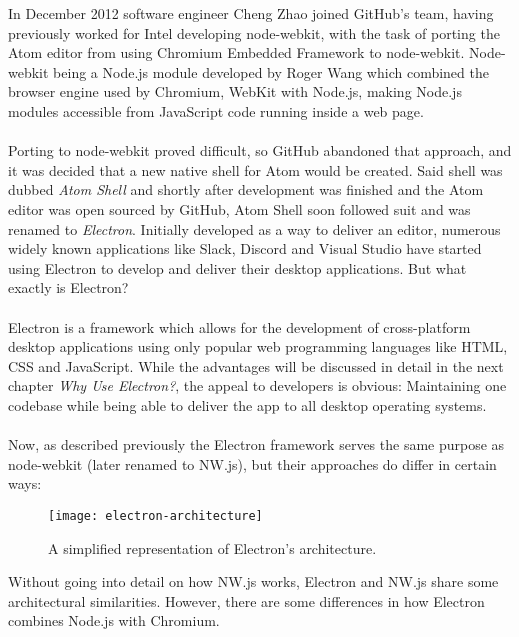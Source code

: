 In December 2012 software engineer Cheng Zhao joined GitHub's team, having previously worked for Intel developing
node-webkit, with the task of porting the Atom editor from using Chromium Embedded Framework to node-webkit.
Node-webkit being a Node.js module developed by Roger Wang which combined the browser engine used by Chromium, WebKit 
with Node.js, making Node.js modules accessible from JavaScript code running inside a web page. \parencite{jensen2017}\paragraph{}

Porting to node-webkit proved difficult, so GitHub abandoned that approach, and it was decided that a new native shell
for Atom would be created.
Said shell was dubbed \emph{Atom Shell} and shortly after development was finished and the Atom editor was open sourced
by GitHub, Atom Shell soon followed suit and was renamed to \emph{Electron}.
Initially developed as a way to deliver an editor, numerous widely known applications like Slack, Discord and Visual
Studio have started using Electron to develop and deliver their desktop applications.
But what exactly is Electron?\paragraph{}
Electron is a framework which allows for the development of cross-platform desktop applications using only popular 
web programming languages like HTML, CSS and JavaScript. 
While the advantages will be discussed in detail in the next chapter \emph{Why Use Electron?}, the appeal to developers
is obvious: Maintaining one codebase while being able to deliver the app to all desktop operating systems.\paragraph{}
Now, as described previously the Electron framework serves the same purpose as node-webkit (later renamed to NW.js), but
their approaches do differ in certain ways: \parencite{jensen2017}
\begin{figure}[ht]
    \label{fig:el-architecture}
    \caption{A simplified representation of Electron's architecture. \parencite{jensen2017}}
    \texttt{[image: electron-architecture]}
\end{figure}
Without going into detail on how NW.js works, Electron and NW.js share some architectural similarities.
However, there are some differences in how Electron combines Node.js with Chromium.\paragraph{}
